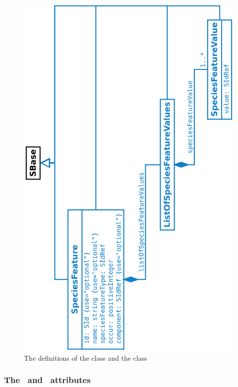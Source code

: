 \begin{figure}[htb]
  \begin{center}
    \includegraphics[angle=-90, scale=0.30]{./figs/multi_009_SpeciesFeature.pdf}
    \caption{The definitions of the \SpeciesFeature class and the \SpeciesFeatureValue class}
  \label{fig:SpeciesFeature}
  \end{center}
\end{figure}


\subsubsection{The \idAtt\ and \nameAtt\ attributes}
\label{def:SpeciesFeature:id}

